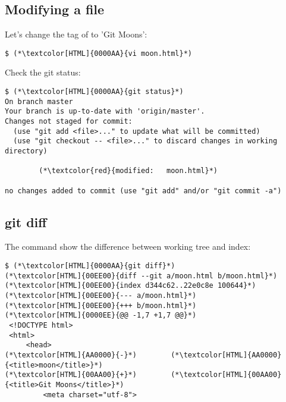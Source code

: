\subsection{Modifying a file}
\begin{frame}[fragile]
  \subslidetitle

  Let's change the  tag of  to 'Git Moons':
  \begin{lstlisting}
$ (*\textcolor[HTML]{0000AA}{vi moon.html}*)
  \end{lstlisting}

  Check the git status:
  \begin{lstlisting}
$ (*\textcolor[HTML]{0000AA}{git status}*)
On branch master
Your branch is up-to-date with 'origin/master'.
Changes not staged for commit:
  (use "git add <file>..." to update what will be committed)
  (use "git checkout -- <file>..." to discard changes in working directory)

        (*\textcolor{red}{modified:   moon.html}*)

no changes added to commit (use "git add" and/or "git commit -a")
  \end{lstlisting}
\end{frame}

\subsection{git diff}
\begin{frame}[fragile]
  \subslidetitle

  The command  show the difference between working tree and index:
  \begin{lstlisting}
$ (*\textcolor[HTML]{0000AA}{git diff}*)
(*\textcolor[HTML]{00EE00}{diff --git a/moon.html b/moon.html}*)
(*\textcolor[HTML]{00EE00}{index d344c62..22e0c8e 100644}*)
(*\textcolor[HTML]{00EE00}{--- a/moon.html}*)
(*\textcolor[HTML]{00EE00}{+++ b/moon.html}*)
(*\textcolor[HTML]{0000EE}{@@ -1,7 +1,7 @@}*)
 <!DOCTYPE html>
 <html>
     <head>
(*\textcolor[HTML]{AA0000}{-}*)        (*\textcolor[HTML]{AA0000}{<title>moon</title>}*)
(*\textcolor[HTML]{00AA00}{+}*)        (*\textcolor[HTML]{00AA00}{<title>Git Moons</title>}*)
         <meta charset="utf-8">
  \end{lstlisting}
\end{frame}

